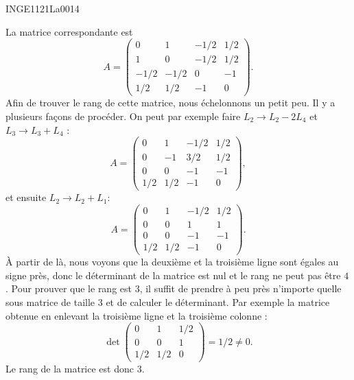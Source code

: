 

\begin{corrige}{INGE1121La0014}

	La matrice correspondante est 
	\begin{equation}
		A=
		\begin{pmatrix}
			 0	&	1	&	-1/2	&	1/2	\\
			 1	&	0	&	-1/2	&	1/2	\\
			 -1/2	&	-1/2	&	0	&	-1	\\ 
			 1/2	&	1/2	&	-1	&	0	 
		 \end{pmatrix}.
	\end{equation}
	Afin de trouver le rang de cette matrice, nous échelonnons un petit peu. Il y a plusieurs façons de procéder. On peut par exemple faire $L_2\to L_2-2L_4$ et $L_3\to L_3+L_4$ :
	\begin{equation}
		A=
		\begin{pmatrix}
			 0	&	1	&	-1/2	&	1/2	\\
			 0	&	-1	&	3/2	&	1/2	\\
			 0	&	0	&	-1	&	-1	\\ 
			 1/2	&	1/2	&	-1	&	0	 
		 \end{pmatrix},
	\end{equation}
	et ensuite $L_2\to L_2+L_1$:
	\begin{equation}
		A=
		\begin{pmatrix}
			 0	&	1	&	-1/2	&	1/2	\\
			 0	&	0	&	1	&	1	\\
			 0	&	0	&	-1	&	-1	\\ 
			 1/2	&	1/2	&	-1	&	0	 
		 \end{pmatrix}.
	\end{equation}
	À partir de là, nous voyons que la deuxième et la troisième ligne sont égales au signe près, donc le déterminant de la matrice est nul et le rang ne peut pas être $4$. Pour prouver que le rang est $3$, il suffit de prendre à peu près n'importe quelle sous matrice de taille $3$ et de calculer le déterminant. Par exemple la matrice obtenue en enlevant la troisième ligne et la troisième colonne :
	\begin{equation}
		\det\begin{pmatrix}
			0	&	1	&	1/2	\\
			0	&	0	&	1	\\
			1/2	&	1/2	&	0
		\end{pmatrix}=1/2\neq 0.
	\end{equation}
	Le rang de la matrice est donc $3$. 


\end{corrige}
